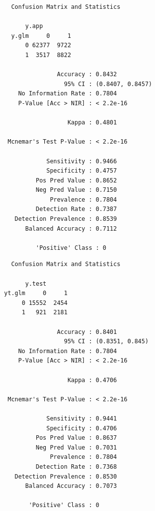 \documentclass{article}
\begin{document}
    \begin{verbatim}
    Confusion Matrix and Statistics

        y.app
    y.glm     0     1
        0 62377  9722
        1  3517  8822
                                            
                 Accuracy : 0.8432          
                   95% CI : (0.8407, 0.8457)
      No Information Rate : 0.7804          
      P-Value [Acc > NIR] : < 2.2e-16       
                                           
                    Kappa : 0.4801          
                                          
   Mcnemar's Test P-Value : < 2.2e-16       
                                          
              Sensitivity : 0.9466          
              Specificity : 0.4757          
           Pos Pred Value : 0.8652          
           Neg Pred Value : 0.7150          
               Prevalence : 0.7804          
           Detection Rate : 0.7387          
     Detection Prevalence : 0.8539          
        Balanced Accuracy : 0.7112          
                                            
           'Positive' Class : 0
    \end{verbatim}
    \begin{verbatim}
    Confusion Matrix and Statistics

        y.test
  yt.glm     0     1
       0 15552  2454
       1   921  2181
                                           
                 Accuracy : 0.8401         
                   95% CI : (0.8351, 0.845)
      No Information Rate : 0.7804         
      P-Value [Acc > NIR] : < 2.2e-16      
                                           
                    Kappa : 0.4706         
                                           
   Mcnemar's Test P-Value : < 2.2e-16      
                                           
              Sensitivity : 0.9441         
              Specificity : 0.4706         
           Pos Pred Value : 0.8637         
           Neg Pred Value : 0.7031         
               Prevalence : 0.7804         
           Detection Rate : 0.7368         
     Detection Prevalence : 0.8530         
        Balanced Accuracy : 0.7073         
                                           
         'Positive' Class : 0                             
    \end{verbatim}
\end{document}
